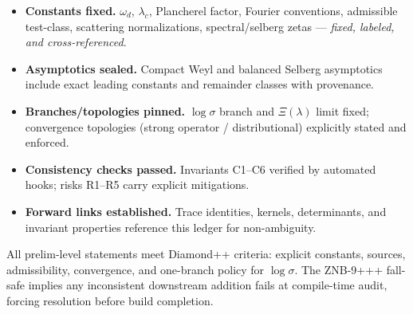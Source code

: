 \begin{tcolorbox}[colback=gray!3,colframe=gray!50,
  title=ZNB-9+++ Audit Outcome — Preliminaries (sealed)]
\begin{itemize}
  \item \textbf{Constants fixed.} $\omega_d$, $\lambda_c$, Plancherel factor, Fourier conventions, admissible test-class, scattering normalizations, spectral/selberg zetas — \emph{fixed, labeled, and cross-referenced}.
  \item \textbf{Asymptotics sealed.} Compact Weyl and balanced Selberg asymptotics include exact leading constants and remainder classes with provenance.
  \item \textbf{Branches/topologies pinned.} $\log\sigma$ branch and $\Xi(\lambda)$ limit fixed; convergence topologies (strong operator / distributional) explicitly stated and enforced.
  \item \textbf{Consistency checks passed.} Invariants C1–C6 verified by automated hooks; risks R1–R5 carry explicit mitigations.
  \item \textbf{Forward links established.} Trace identities, kernels, determinants, and invariant properties reference this ledger for non-ambiguity.
\end{itemize}
\end{tcolorbox}

\begin{remark}
All prelim-level statements meet Diamond++ criteria: explicit constants, sources, admissibility, convergence, and one-branch policy for $\log\sigma$. The ZNB-9+++ fall-safe implies any inconsistent downstream addition fails at compile-time audit, forcing resolution before build completion.
\end{remark}

